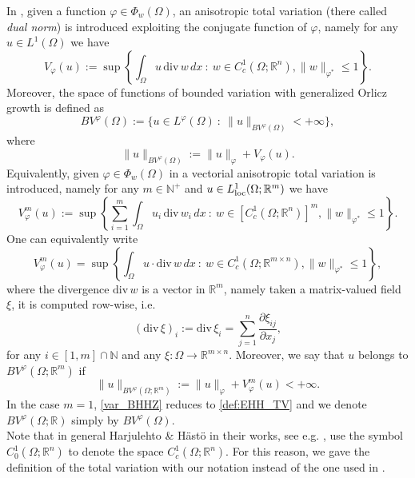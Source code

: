 \documentclass[a4paper,11pt,oneside,notitlepage]{article}
\numberwithin{equation}{section}
\def\R{\mathbb{R}}
\def\N{\mathbb{N}}
\def\loc{{\rm loc}}
\renewcommand{\div}{\mathrm{div}}
\newcommand{\vphi}{\varphi}
\newcommand{\st}{ \ : \ }
\begin{document}
In \cite[Definition 4.1]{EHH}, given a function $\vphi \in \Phi_w(\Omega)$, an anisotropic total variation (there called {\it dual norm}) is introduced exploiting the conjugate function of $\vphi$, namely for any $u \in L^1(\Omega)$ we have
\begin{equation}
\label{def:EHH_TV}
    V_\vphi(u) := \sup \left\{ \int_\Omega u \, \div \, w \, dx \st w \in C^1_c(\Omega; \R^n), \|w\|_{\vphi^*} \le 1 \right\}.
\end{equation}
Moreover, the space of functions of bounded variation with generalized Orlicz growth is defined as
\begin{equation}
\label{def:BV_phi}
    BV^\vphi(\Omega) := \{ u \in L^\vphi(\Omega) \st \|u\|_{BV^\vphi(\Omega)} < +\infty \},
\end{equation}
where
\begin{equation}
\label{norm_BVphi}
    \|u\|_{BV^\vphi(\Omega)} := \|u\|_\vphi + V_\vphi(u).
\end{equation}
Equivalently, given $\vphi \in \Phi_w(\Omega)$ in \cite{BHHZ} a vectorial anisotropic total variation is introduced, namely for any $m \in \N^+$ and $u \in L^1_\loc(\Omega;\R^m)$ we have
\begin{equation}
\label{var_BHHZ}
    V^m_\vphi(u) := \sup \left \{\sum_{i = 1}^m \int_\Omega u_i \, \div \, w_i \, dx \st w \in \left[C^1_c(\Omega; \R^n)\right]^m, \|w\|_{\vphi^*} \le 1 \right\}.
\end{equation}
One can equivalently write
\begin{equation*}
    V^m_\vphi(u) = \sup \left \{ \int_\Omega u \cdot \div \, w \, dx \st w \in C^1_c(\Omega; \R^{m \times n}), \|w\|_{\vphi^*} \le 1 \right\},
\end{equation*}
where the divergence $\div \, w$ is a vector in $\R^m$, namely taken a matrix-valued field $\xi$, it is computed row-wise, i.e.
\begin{equation}
\label{divrow}
    (\div \, \xi)_i :=  \div \, \xi_i = \sum_{j = 1}^n \frac{\partial \xi_{ij}}{\partial x_j},
\end{equation}
for any $i \in [1,m] \cap \N$ and any $\xi : \Omega \to \R^{m \times n}$. Moreover, we say that $u$ belongs to $BV^\vphi(\Omega;\R^m)$ if
\begin{equation*}
    \|u\|_{BV^\vphi(\Omega;\R^m)} := \|u\|_\vphi + V_\vphi^m(u) < +\infty.
\end{equation*}
In the case $m = 1$, \eqref{var_BHHZ} reduces to \eqref{def:EHH_TV} and we denote $BV^\vphi(\Omega;\R)$ simply by $BV^\vphi(\Omega)$.
\\
Note that in general Harjulehto \& H\"ast\"o in their works, see e.g. \cite{HaH}, use the symbol $C^1_0(\Omega; \R^n)$ to denote the space $C^1_c(\Omega; \R^n)$. For this reason, we gave the definition of the total variation with our notation instead of the one used in \cite{EHH}.
\end{document}
